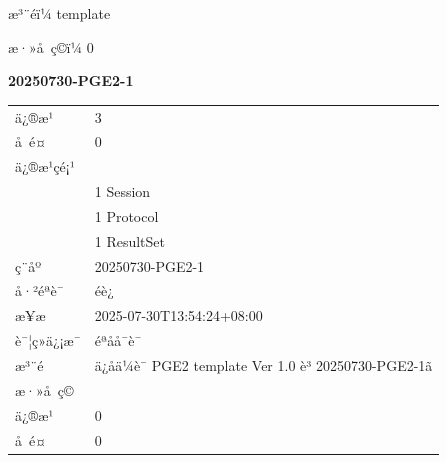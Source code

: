 \documentclass[UTF8,10pt,a4paper,fontset=fandol]{ctexart}
\newcommand{\fieldvalue}[1]{#1}
\begin{document}
\noindent
æ³¨éï¼%
\fieldvalue{template}

\noindent
æ·»å ç©ï¼%
\fieldvalue{0}


\newpage

\noindent\textbf{20250730-PGE2-1}

\begin{tabular}{ll}
ä¿®æ¹ &
\fieldvalue{3}\\
å é¤ &
\fieldvalue{0}\\
\multicolumn{2}{l}{ä¿®æ¹çé¡¹}\\
&
\fieldvalue{1}\quad
\fieldvalue{Session}\\
&
\fieldvalue{1}\quad
\fieldvalue{Protocol}\\
&
\fieldvalue{1}\quad
\fieldvalue{ResultSet}\\[2pt]

ç¨åº &
\fieldvalue{20250730-PGE2-1}\\
å·²éªè¯ &
\fieldvalue{éè¿}\\
æ¥æ &
\fieldvalue{2025-07-30T13:54:24+08:00}\\
è¯¦ç»ä¿¡æ¯ &
\fieldvalue{éªå­å¯è¯}\\
æ³¨é &
\fieldvalue{ä¿å­ä¼è¯ PGE2 template Ver 1.0 è³ 20250730-PGE2-1ã}\\[2pt]

æ·»å ç© &
\fieldvalue{}\\
ä¿®æ¹ &
\fieldvalue{0}\\
å é¤ &
\fieldvalue{0}\\[2pt]


\end{tabular}
\end{document}
